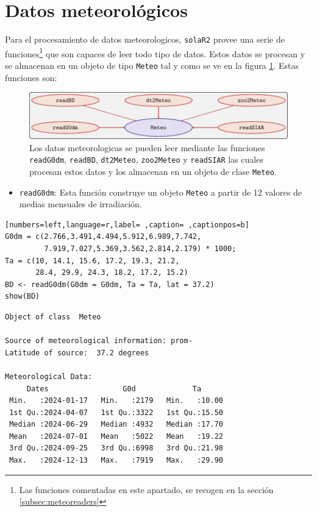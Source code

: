 \section{Datos meteorológicos}
\label{sec:orgfb639e1}
\label{sec:datos-meteorologicos}
Para el procesamiento de datos meteorologicos, \texttt{solaR2} provee una serie de funciones\footnote{Las funciones comentadas en este apartado, se recogen en la sección \ref{subsec:meteoreaders}} que son capaces de leer todo tipo de datos. Estos datos se procesan y se almacenan en un objeto de tipo \texttt{Meteo} tal y como se ve en la figura \ref{fig:meteo}. Estas funciones son:
\begin{figure}[]
\centering
\includegraphics[keepaspectratio,width=\textwidth,height=0.5\textheight]{figuras/meteo.pdf}
\caption{Los datos meteorologicas se pueden leer mediante las funciones \texttt{readG0dm}, \texttt{readBD}, \texttt{dt2Meteo}, \texttt{zoo2Meteo} y \texttt{readSIAR} las cuales procesan estos datos y los almacenan en un objeto de clase \texttt{Meteo}. \label{fig:meteo}}
\end{figure}
\begin{itemize}
\item \texttt{readG0dm}: Esta función construye un objeto \texttt{Meteo} a partir de 12 valores de medias mensuales de irradiación.
\end{itemize}
\begin{lstlisting}[numbers=left,language=r,label= ,caption= ,captionpos=b]
G0dm = c(2.766,3.491,4.494,5.912,6.989,7.742,
         7.919,7.027,5.369,3.562,2.814,2.179) * 1000;
Ta = c(10, 14.1, 15.6, 17.2, 19.3, 21.2,
       28.4, 29.9, 24.3, 18.2, 17.2, 15.2)
BD <- readG0dm(G0dm = G0dm, Ta = Ta, lat = 37.2)
show(BD)
\end{lstlisting}

\begin{verbatim}
Object of class  Meteo 

Source of meteorological information: prom- 
Latitude of source:  37.2 degrees

Meteorological Data:
     Dates                 G0d             Ta       
 Min.   :2024-01-17   Min.   :2179   Min.   :10.00  
 1st Qu.:2024-04-07   1st Qu.:3322   1st Qu.:15.50  
 Median :2024-06-29   Median :4932   Median :17.70  
 Mean   :2024-07-01   Mean   :5022   Mean   :19.22  
 3rd Qu.:2024-09-25   3rd Qu.:6998   3rd Qu.:21.98  
 Max.   :2024-12-13   Max.   :7919   Max.   :29.90
\end{verbatim}

